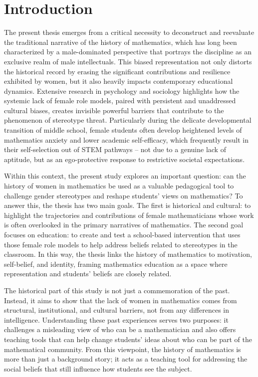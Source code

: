 \chapter{Introduction}

The present thesis emerges from a critical necessity to deconstruct and reevaluate the traditional narrative of the history of mathematics, which has long been characterized by a male-dominated perspective that portrays the discipline as an exclusive realm of male intellectuals.
This biased representation not only distorts the historical record by erasing the significant contributions and resilience exhibited by women, but it also heavily impacts contemporary educational dynamics. 
Extensive research in psychology and sociology highlights how the systemic lack of female role models, paired with persistent and unaddressed cultural biases, creates invisible powerful barriers that contribute to the phenomenon of stereotype threat.
Particularly during the delicate developmental transition of middle school, female students often develop heightened levels of mathematics anxiety and lower academic self-efficacy, which frequently result in their self-selection out of STEM pathways -- not due to a genuine lack of aptitude, but as an ego-protective response to restrictive societal expectations.

Within this context, the present study explores an important question: can the history of women in mathematics be used as a valuable pedagogical tool to challenge gender stereotypes and reshape students' views on mathematics? To answer this, the thesis has two main goals. The first is historical and cultural: to highlight the trajectories and contributions of female mathematicians whose work is often overlooked in the primary narratives of mathematics. The second goal focuses on education: to create and test a school-based intervention that uses those female role models to help address beliefs related to stereotypes in the classroom. In this way, the thesis links the history of mathematics to motivation, self-belief, and identity, framing mathematics education as a space where representation and students' beliefs are closely related.

The historical part of this study is not just a commemoration of the past. Instead, it aims to show that the lack of women in mathematics comes from structural, institutional, and cultural barriers, not from any differences in intelligence. Understanding these past experiences serves two purposes: it challenges a misleading view of who can be a mathematician and also offers teaching tools that can help change students' ideas about who can be part of the mathematical community. From this viewpoint, the history of mathematics is more than just a background story; it acts as a teaching tool for addressing the social beliefs that still influence how students see the subject.

